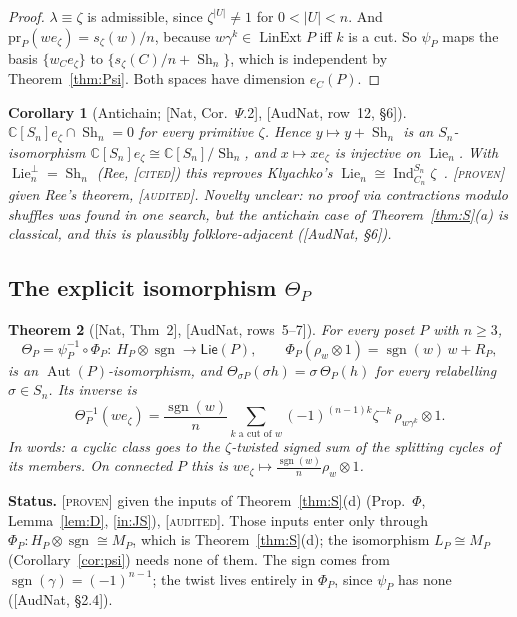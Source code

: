 \documentclass[11pt]{article}
\newtheorem{theorem}{Theorem}[section]
\newtheorem{corollary}[theorem]{Corollary}
\theoremstyle{definition}
\theoremstyle{remark}
\newcommand{\Lin}{\operatorname{LinExt}}
\newcommand{\Aut}{\operatorname{Aut}}
\newcommand{\Lie}{\operatorname{Lie}}
\newcommand{\sgn}{\operatorname{sgn}}
\newcommand{\Ind}{\operatorname{Ind}}
\newcommand{\PLie}{\mathsf{Lie}}
\newcommand{\Sh}{\operatorname{Sh}}
\newcommand{\st}[1]{\textup{[\textsc{#1}]}}
\begin{document}
\begin{proof}
$\lambda\equiv\zeta$ is admissible, since $\zeta^{|U|}\ne1$ for
$0<|U|<n$. And $\mathrm{pr}_P(we_\zeta)=s_\zeta(w)/n$, because $w\gamma^k\in\Lin P$
iff $k$ is a cut. So $\psi_P$ maps the basis $\{w_Ce_\zeta\}$ to
$\{s_\zeta(C)/n+\Sh_n\}$, which is independent by Theorem~\ref{thm:Psi}.
Both spaces have dimension $e_C(P)$.
\end{proof}

\begin{corollary}[Antichain; {[Nat, Cor.~$\Psi$.2]}, {[AudNat, row~12, \S6]}]\label{cor:klyachko}
$\mathbb C[S_n]e_\zeta\cap\Sh_n=0$ for every primitive $\zeta$. Hence
$y\mapsto y+\Sh_n$ is an $S_n$-isomorphism
$\mathbb C[S_n]e_\zeta\cong\mathbb C[S_n]/\Sh_n$, and $x\mapsto xe_\zeta$ is
injective on $\Lie_n$. With $\Lie_n^\perp=\Sh_n$ (Ree, \st{cited}) this
reproves Klyachko's $\Lie_n\cong\Ind_{C_n}^{S_n}\zeta$~\cite{Klyachko}.
\st{proven} given Ree's theorem, \st{audited}. \emph{Novelty unclear}: no
proof via contractions modulo shuffles was found in one search, but the
antichain case of Theorem~\ref{thm:S}(a) is classical, and this is
plausibly folklore-adjacent ([AudNat, \S6]).
\end{corollary}

\subsection{The explicit isomorphism $\Theta_P$}

\begin{theorem}[{[Nat, Thm~2]}, {[AudNat, rows~5--7]}]\label{thm:Theta}
For every poset $P$ with $n\ge3$,
\[
\Theta_P=\psi_P^{-1}\circ\Phi_P:\ H_P\otimes\sgn\to\PLie(P),
\qquad \Phi_P(\rho_w\otimes1)=\sgn(w)\,w+R_P,
\]
is an $\Aut(P)$-isomorphism, and $\Theta_{\sigma P}(\sigma h)=\sigma\,\Theta_P(h)$
for every relabelling $\sigma\in S_n$. Its inverse is
\[
\Theta_P^{-1}(we_\zeta)=\frac{\sgn(w)}{n}\sum_{k\text{ a cut of }w}(-1)^{(n-1)k}\zeta^{-k}\,\rho_{w\gamma^k}\otimes1 .
\]
In words: a cyclic class goes to the $\zeta$-twisted signed sum of the
splitting cycles of its members. On connected $P$ this is
$we_\zeta\mapsto\frac{\sgn(w)}n\rho_w\otimes1$.
\end{theorem}

\noindent\textbf{Status.} \st{proven} given the inputs of
Theorem~\ref{thm:S}(d) (Prop.~$\Phi$, Lemma~\ref{lem:D}, \ref{in:JS}),
\st{audited}. Those inputs enter only through
$\Phi_P:H_P\otimes\sgn\cong M_P$, which is Theorem~\ref{thm:S}(d); the
isomorphism $L_P\cong M_P$ (Corollary~\ref{cor:psi}) needs none of them. The
sign comes from $\sgn(\gamma)=(-1)^{n-1}$; the twist lives entirely in
$\Phi_P$, since $\psi_P$ has none ([AudNat, \S2.4]).
\end{document}
